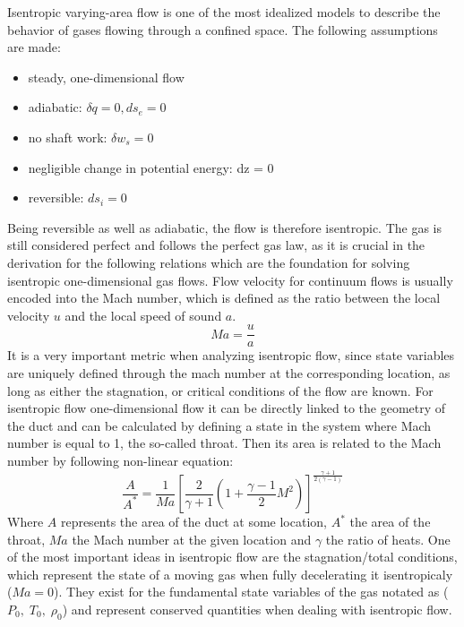 	Isentropic varying-area flow is one of the most idealized models to describe the behavior of gases flowing through a confined space. The following assumptions are made:
	\begin{itemize}
		\item steady, one-dimensional flow
		\item adiabatic: $\delta q = 0, ds_e = 0$
		\item no shaft work: $\delta w_s = 0$
		\item negligible change in potential energy: dz = 0
		\item reversible: $ds_i = 0$
	\end{itemize}
	Being reversible as well as adiabatic, the flow is therefore isentropic.
	The gas is still considered perfect and follows the perfect gas law, as it is crucial in the derivation for the following relations which are the foundation for solving isentropic one-dimensional gas flows.
	Flow velocity for continuum flows is usually encoded into the Mach number, which is defined as the ratio between the local velocity $u$ and the local speed of sound $a$.
	\begin{equation}
		Ma = \frac{u}{a}
		\label{eq:mach-number}
	\end{equation}
	It is a very important metric when analyzing isentropic flow, since state variables are uniquely defined through the mach number at the corresponding location, as long as either the stagnation, or critical conditions of the flow are known.
	For isentropic flow one-dimensional flow it can be directly linked to the geometry of the duct and can be calculated by defining a state in the system where Mach number is equal to 1, the so-called throat.
	Then its area is related to the Mach number by following non-linear equation:
	\begin{equation}
		\frac{A}{A^*} = \frac{1}{Ma} \left[ \frac{2}{\gamma + 1} \left( 1 + \frac{\gamma - 1}{2} M^2 \right) \right]^{\frac{\gamma + 1}{2(\gamma - 1)}}
		\label{eq:area_ratio_mach}
	\end{equation}
	Where $A$ represents the area of the duct at some location, $A^*$ the area of the throat, $Ma$ the Mach number at the given location and $\gamma$ the ratio of heats.
	One of the most important ideas in isentropic flow are the stagnation/total conditions, which represent the state of a moving gas when fully decelerating it isentropicaly ($Ma = 0$).
	They exist for the fundamental state variables of the gas notated as ($P_0,\;T_0,\;\rho_0$) and represent conserved quantities when dealing with isentropic flow.
